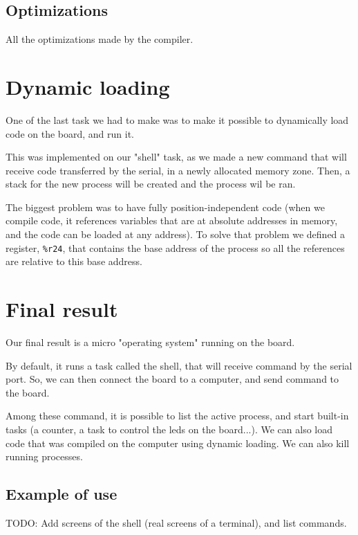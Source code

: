 \documentclass[openany, a4paper]{book}
\begin{document}
      \subsection{Optimizations}
        All the optimizations made by the compiler.

    \section{Dynamic loading}

        One of the last task we had to make was to make it possible to dynamically
        load code on the board, and run it.

        This was implemented on our "shell" task, as we made a new command that will
        receive code transferred by the serial, in a newly allocated memory zone.
        Then, a stack for the new process will be created and the process wil be ran.

        The biggest problem was to have fully position-independent code (when we compile code,
        it references variables that are at absolute addresses in memory, and the code can be loaded
        at any address). To solve that problem we defined a register, \verb+%r24+, that contains the
        base address of the process so all the references are relative to this base address.

    \section{Final result}
      Our final result is a micro "operating system" running on the board.
      
      By default, it runs a task called the shell, that will receive command by the serial port.
      So, we can then connect the board to a computer, and send command to the board.
        
      Among these command, it is possible to list the active process, and start built-in tasks (a counter,
      a task to control the leds on the board...). We can also load code that was compiled on the computer using
      dynamic loading. We can also kill running processes.

      \subsection{Example of use}

      TODO: Add screens of the shell (real screens of a terminal), and list commands.
\end{document}
